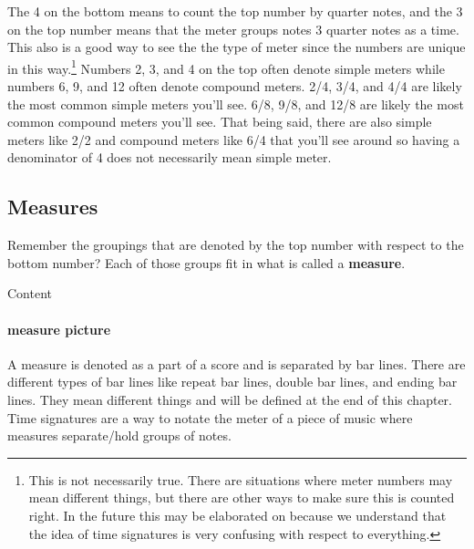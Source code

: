 \documentclass[../OpenAppliedMusicTheory.tex]{subfiles}
\begin{document}
        The 4 on the bottom means to count the top number by quarter notes, and the 3 on the top number means that the meter groups notes 3 quarter notes as a time. This also is a good way to see the the type of meter since the numbers are unique in this way.\footnote{This is not necessarily true. There are situations where meter numbers may mean different things, but there are other ways to make sure this is counted right. In the future this may be elaborated on because we understand that the idea of time signatures is very confusing with respect to everything.} Numbers 2, 3, and 4 on the top often denote simple meters while numbers 6, 9, and 12 often denote compound meters. 2/4, 3/4, and 4/4 are likely the most common simple meters you'll see. 6/8, 9/8, and 12/8 are likely the most common compound meters you'll see. That being said, there are also simple meters like 2/2 and compound meters like 6/4 that you'll see around so having a denominator of 4 does not necessarily mean simple meter. 


        \subsection{Measures}
        Remember the groupings that are denoted by the top number with respect to the bottom number? Each of those groups fit in what is called a \textbf{measure}. 

        \begin{tcolorbox}[
            colback=red!5!white,
            colframe=red!60!gray,
            title={Test Aside}
        ]
            Content
        \end{tcolorbox}

        \paragraph{measure picture}
        A measure is denoted as a part of a score and is separated by bar lines. There are different types of bar lines like repeat bar lines, double bar lines, and ending bar lines. They mean different things and will be defined at the end of this chapter. Time signatures are a way to notate the meter of a piece of music where measures separate/hold groups of notes.
\end{document}
